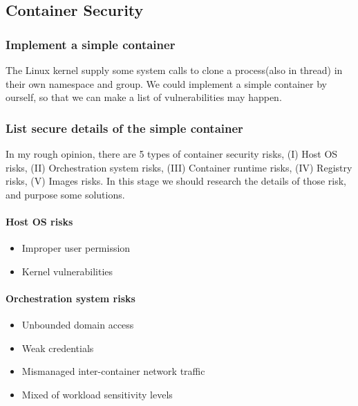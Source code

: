 \documentclass[12pt,a4paper]{IEEEconf}
\begin{document}
\subsection{Container Security}
\subsubsection{Implement a simple container}
The Linux kernel supply some system calls to clone a process(also in thread) in their own namespace
and group. We could implement a simple container by ourself, so that we can make a list of
vulnerabilities may happen.
\begin{CJK*}{UTF8}{bsmi}
  \UseRawInputEncoding
\end{CJK*}

\subsubsection{List secure details of the simple container}
In my rough opinion, there are 5 types of container security risks, (\RN{1}) Host OS risks, (\RN{2})
Orchestration system risks, (\RN{3}) Container runtime risks, (\RN{4}) Registry risks, (\RN{5})
Images risks. In this stage we should research the details of those risk, and purpose some solutions.

\paragraph{Host OS risks}
\begin{itemize}
  \item Improper user permission
  \item Kernel vulnerabilities
\end{itemize}

\paragraph{Orchestration system risks}
\begin{itemize}
  \item Unbounded domain access
  \item Weak credentials
  \item Mismanaged inter-container network traffic
  \item Mixed of workload sensitivity levels
\end{itemize}
\end{document}
